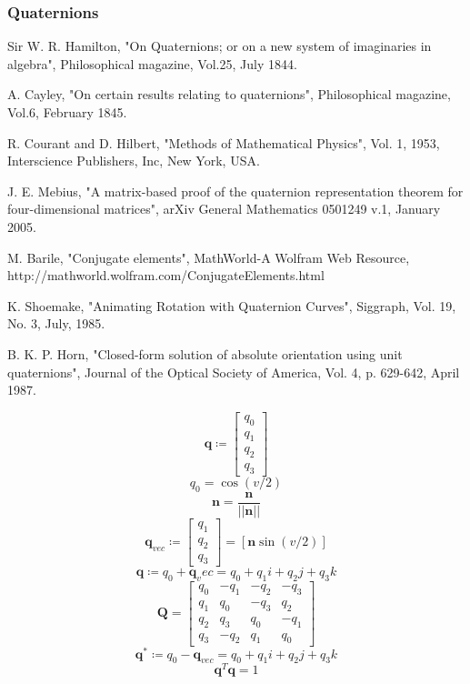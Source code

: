 \documentclass[12pt,a4paper,oneside]{article}
\begin{document}
\subsubsection{Quaternions}
Sir W. R. Hamilton, "On Quaternions; or on a new system of imaginaries in algebra", Philosophical magazine, Vol.25, July 1844.\par
[12] A. Cayley, "On certain results relating to quaternions", Philosophical magazine, Vol.6, February 1845.\par
[13] R. Courant and D. Hilbert, "Methods of Mathematical Physics", Vol. 1, 1953, Interscience Publishers, Inc, New York, USA.\par
[14] J. E. Mebius, "A matrix-based proof of the quaternion representation theorem for four-dimensional matrices", arXiv General Mathematics 0501249 v.1, January 2005.\par
[15] M. Barile, "Conjugate elements", MathWorld-A Wolfram Web Resource, http://mathworld.wolfram.com/ConjugateElements.html \par
[16] K. Shoemake, "Animating Rotation with Quaternion Curves", Siggraph, Vol. 19, No. 3, July, 1985. \par
[17] B. K. P. Horn, "Closed-form solution of absolute orientation using unit quaternions", Journal of the Optical Society of America, Vol. 4, p. 629-642, April 1987. \par
\begin{equation}
\bm{q} \coloneqq \begin{bmatrix}
q_0 \\
q_1 \\
q_2 \\
q_3
\end{bmatrix}
\end{equation}
\begin{equation}
q_0 = \cos(v/2)
\end{equation}
\begin{equation}
\bm{n} = \frac{\bm{n}}{||\bm{n}||}
\end{equation}
\begin{equation}
\bm{q}_{vec} \coloneqq \begin{bmatrix}
q_1 \\
q_2 \\
q_3
\end{bmatrix}
= [\bm{n}\sin(v/2)]
\end{equation}
\begin{equation}
\bm{q} \coloneqq q_0 + \bm{q}_vec = q_0 + q_1i + q_2j+ q_3k
\end{equation}
\begin{equation}
\bm{Q} = \begin{bmatrix}
q_0 & -q_1 & -q_2 & -q_3 \\
q_1 & q_0 & -q_3 & q_2 \\
q_2 & q_3 & q_0 & -q_1 \\
q_3 & -q_2 & q_1 & q_0
\end{bmatrix}
\end{equation}
\begin{equation}
\bm{q}^* \coloneqq q_0 - \bm{q}_{vec} = q_0 + q_1i + q_2j+ q_3k
\end{equation}
\begin{equation}
\bm{q}^T\bm{q} = 1
\end{equation}
\end{document}
